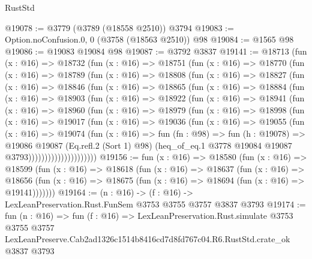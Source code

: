 \begin{lexlean}{RustStd}
\begin{coremodule}
@19078 := @3779 (@3789 (@18558 @2510)) @3794
@19083 := Option.noConfusion.{0, 0} (@3758 (@18563 @2510)) @98
@19084 := @1565 @98
@19086 := @19083 @19084 @98
@19087 := @3792 @3837
@19141 := @18713
    (fun (x : @16) =>
    @18732
      (fun (x : @16) =>
      @18751
        (fun (x : @16) =>
        @18770
          (fun (x : @16) =>
          @18789
            (fun (x : @16) =>
            @18808
              (fun (x : @16) =>
              @18827
                (fun (x : @16) =>
                @18846
                  (fun (x : @16) =>
                  @18865
                    (fun (x : @16) =>
                    @18884
                      (fun (x : @16) =>
                      @18903
                        (fun (x : @16) =>
                        @18922
                          (fun (x : @16) =>
                          @18941
                            (fun (x : @16) =>
                            @18960
                              (fun (x : @16) =>
                              @18979
                                (fun (x : @16) =>
                                @18998
                                  (fun (x : @16) =>
                                  @19017
                                    (fun (x : @16) =>
                                    @19036
                                      (fun (x : @16) =>
                                      @19055
                                        (fun (x : @16) =>
                                        @19074
                                          (fun (x : @16) =>
                                          fun (fn : @98) =>
                                          fun (h : @19078) =>
                                          @19086
                                            @19087
                                            (Eq.refl.{2} (Sort 1) @98)
                                            (heq_of_eq.{1}
                                              @3778
                                              @19084
                                              @19087
                                              @3793)))))))))))))))))))))
@19156 := fun (x : @16) =>
  @18580
    (fun (x : @16) =>
    @18599
      (fun (x : @16) =>
      @18618
        (fun (x : @16) =>
        @18637
          (fun (x : @16) =>
          @18656 (fun (x : @16) => @18675 (fun (x : @16) => @18694 (fun (x : @16) => @19141)))))))
@19164 := (n : @16) -> (f : @16) -> LexLeanPreservation.Rust.FunSem @3753 @3755 @3757 @3837 @3793
@19174 := fun (n : @16) =>
  fun (f : @16) =>
  LexLeanPreservation.Rust.simulate
    @3753
    @3755
    @3757
    LexLeanPreserve.Cab2ad1326c1514b8416cd7d8fd767c04.R6.RustStd.crate_ok
    @3837
    @3793
\end{coremodule}
\end{lexlean}
